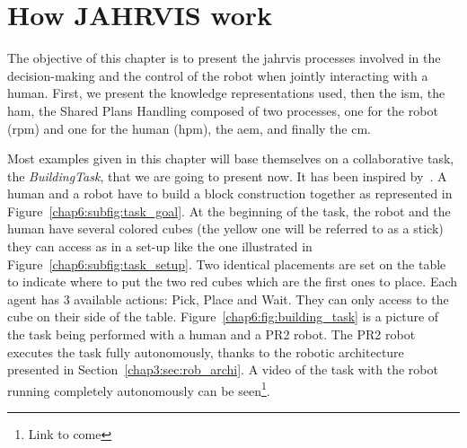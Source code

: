 \documentclass[a4paper,11pt,twoside]{StyleThese}
\begin{document}
	\setcounter{chapter}{5} %
	\dominitoc
	\faketableofcontents
	\fi

\chapter{How JAHRVIS work}\label{chapter:chap6}
\minitoc

The objective of this chapter is to present the \acrshort{jahrvis} processes involved in the decision-making and the control of the robot when jointly interacting with a human. First, we present the knowledge representations used, then the \acrlong{ism}, the \acrlong{ham}, the Shared Plans Handling composed of two processes, one for the robot (\acrlong{rpm}) and one for the human (\acrlong{hpm}), the \acrlong{aem}, and finally the \acrlong{cm}.

Most examples given in this chapter will base themselves on a collaborative task, the \textit{BuildingTask}, that we are going to present now. It has been inspired by~\cite{devin_2017_decisions}. A human and a robot have to build a block construction together as represented in Figure~\ref{chap6:subfig:task_goal}. At the beginning of the task, the robot and the human have several colored cubes (the yellow one will be referred to as a stick) they can access as in a set-up like the one illustrated in Figure~\ref{chap6:subfig:task_setup}. Two identical placements are set on the table to indicate where to put the two red cubes which are the first ones to place. Each agent has 3 available actions: Pick, Place and Wait. They can only access to the cube on their side of the table. Figure~\ref{chap6:fig:building_task} is a picture of the task being performed with a human and a PR2 robot. The PR2 robot executes the task fully autonomously, thanks to the robotic architecture presented in Section~\ref{chap3:sec:rob_archi}. A video of the task with the robot running completely autonomously can be seen\footnote{Link to come}.
\end{document}
